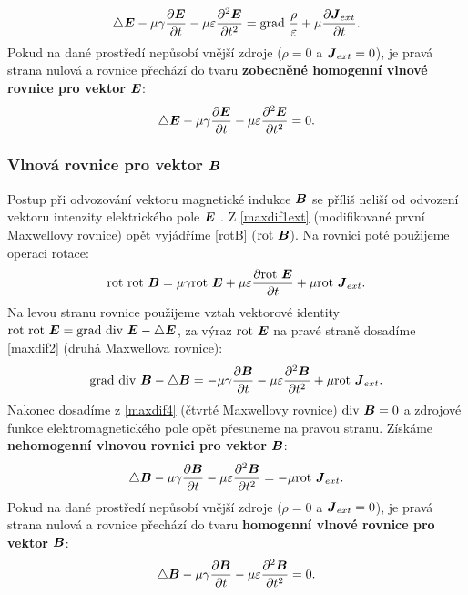 \documentclass[12pt,a4paper,oneside]{article}
\numberwithin{equation}{section} %
\numberwithin{figure}{section} %
\numberwithin{table}{section} %
\renewcommand{\vec}[1]{\mbox{\boldmath$#1$}} %
\newcommand{\grad}{\mathrm{grad}\ }
\newcommand{\rot}{\mathrm{rot}\ }
\renewcommand{\div}{\mathrm{div}\ }
\begin{document}
\begin{equation}
\label{nehomovlnovkaE}
\triangle \vec{E} - \mu \gamma \frac{\partial \vec{E}}{\partial t} - \mu \varepsilon \frac{\partial ^2 \vec{E}}{\partial t ^2} = \grad \frac{\rho}{\varepsilon} + \mu \frac{\partial \vec{J} _{ext}}{\partial t} .
\end{equation}
Pokud na dané prostředí nepůsobí vnější zdroje ($\rho = 0$ a $\vec{J} _{ext} = 0$), je pravá strana nulová a rovnice přechází do tvaru \textbf{zobecněné homogenní vlnové rovnice pro vektor} $\vec{E}$:
\begin{equation}
\label{homovlnovkaE}
\triangle \vec{E} - \mu \gamma \frac{\partial \vec{E}}{\partial t} - \mu \varepsilon \frac{\partial ^2 \vec{E}}{\partial t ^2} = 0 .
\end{equation}

\subsubsection*{Vlnová rovnice pro vektor $\vec{B}$}
Postup při odvozování vektoru magnetické indukce $\vec{B}$ se příliš neliší od odvození vektoru intenzity elektrického pole $\vec{E}$ . Z \ref{maxdif1ext} (modifikované první Maxwellovy rovnice) opět vyjádříme \ref{rotB} ($\rot \vec{B}$). Na rovnici poté použijeme operaci rotace:
\begin{equation}
\rot \rot \vec{B} = \mu \gamma \rot \vec{E} + \mu \varepsilon \frac{\partial \rot \vec{E}}{\partial t} + \mu \rot \vec{J} _{ext} .
\end{equation}
Na levou stranu rovnice použijeme vztah vektorové identity $\rot \rot \vec{E} =  \grad \div \vec{E} - \triangle \vec{E}$, za výraz $\rot \vec{E}$ na pravé straně dosadíme \ref{maxdif2} (druhá Maxwellova rovnice):
\begin{equation}
\grad \div \vec{B} - \triangle \vec{B} = - \mu \gamma \frac{\partial \vec{B}}{\partial t} - \mu \varepsilon \frac{\partial ^2 \vec{B}}{\partial t^2} + \mu \rot \vec{J} _{ext} .
\end{equation}
Nakonec dosadíme z \ref{maxdif4} (čtvrté Maxwellovy rovnice) $\div \vec{B} = 0$ a zdrojové funkce elektromagnetického pole opět přesuneme na pravou stranu. Získáme \textbf{nehomogenní vlnovou rovnici pro vektor} $\vec{B}$:
\begin{equation}
\label{nehomovlnovkaB}
\triangle \vec{B} - \mu \gamma \frac{\partial \vec{B}}{\partial t} - \mu \varepsilon \frac{\partial ^2 \vec{B}}{\partial t^2} = - \mu \rot \vec{J} _{ext} .
\end{equation}
Pokud na dané prostředí nepůsobí vnější zdroje ($\rho = 0$ a $\vec{J} _{ext} = 0$), je pravá strana nulová a rovnice přechází do tvaru \textbf{homogenní vlnové rovnice pro vektor} $\vec{B}$:
\begin{equation}
\label{homovlnovkaB}
\triangle \vec{B} - \mu \gamma \frac{\partial \vec{B}}{\partial t} - \mu \varepsilon \frac{\partial ^2 \vec{B}}{\partial t^2} = 0 .
\end{equation}
\end{document}
